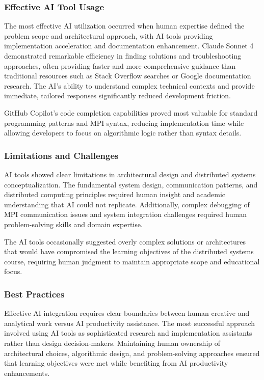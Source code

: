 \documentclass{article}
\begin{document}
\subsubsection{Effective AI Tool Usage}
The most effective AI utilization occurred when human expertise defined the problem scope and architectural approach, with AI tools providing implementation acceleration and documentation enhancement. Claude Sonnet 4 demonstrated remarkable efficiency in finding solutions and troubleshooting approaches, often providing faster and more comprehensive guidance than traditional resources such as Stack Overflow searches or Google documentation research. The AI's ability to understand complex technical contexts and provide immediate, tailored responses significantly reduced development friction.

GitHub Copilot's code completion capabilities proved most valuable for standard programming patterns and MPI syntax, reducing implementation time while allowing developers to focus on algorithmic logic rather than syntax details.

\subsubsection{Limitations and Challenges}
AI tools showed clear limitations in architectural design and distributed systems conceptualization. The fundamental system design, communication patterns, and distributed computing principles required human insight and academic understanding that AI could not replicate. Additionally, complex debugging of MPI communication issues and system integration challenges required human problem-solving skills and domain expertise.

The AI tools occasionally suggested overly complex solutions or architectures that would have compromised the learning objectives of the distributed systems course, requiring human judgment to maintain appropriate scope and educational focus.

\subsubsection{Best Practices}
Effective AI integration requires clear boundaries between human creative and analytical work versus AI productivity assistance. The most successful approach involved using AI tools as sophisticated research and implementation assistants rather than design decision-makers. Maintaining human ownership of architectural choices, algorithmic design, and problem-solving approaches ensured that learning objectives were met while benefiting from AI productivity enhancements.
\end{document}

